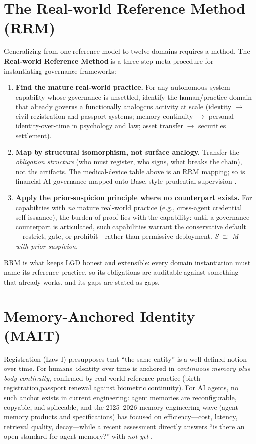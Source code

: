 \documentclass[12pt]{article}
\begin{document}
\section{The Real-world Reference Method (RRM)}\label{sec:rrm}

Generalizing from one reference model to twelve domains requires a method. The \textbf{Real-world Reference Method} is a three-step meta-procedure for instantiating governance frameworks:

\begin{enumerate}[itemsep=2pt]
  \item \textbf{Find the mature real-world practice.} For any autonomous-system capability whose governance is unsettled, identify the human/practice domain that already governs a functionally analogous activity at scale (identity $\rightarrow$ civil registration and passport systems; memory continuity $\rightarrow$ personal-identity-over-time in psychology and law; asset transfer $\rightarrow$ securities settlement).
  \item \textbf{Map by structural isomorphism, not surface analogy.} Transfer the \emph{obligation structure} (who must register, who signs, what breaks the chain), not the artifacts. The medical-device table above is an RRM mapping; so is financial-AI governance mapped onto Basel-style prudential supervision \cite{lgdfin}.
  \item \textbf{Apply the prior-suspicion principle where no counterpart exists.} For capabilities with \emph{no} mature real-world practice (e.g., cross-agent credential self-issuance), the burden of proof lies with the capability: until a governance counterpart is articulated, such capabilities warrant the conservative default---restrict, gate, or prohibit---rather than permissive deployment. \emph{S $\cong$ M with prior suspicion.}
\end{enumerate}

RRM is what keeps LGD honest and extensible: every domain instantiation must name its reference practice, so its obligations are auditable against something that already works, and its gaps are stated as gaps.

\section{Memory-Anchored Identity (MAIT)}\label{sec:mait}

Registration (Law I) presupposes that ``the same entity'' is a well-defined notion over time. For humans, identity over time is anchored in \emph{continuous memory plus body continuity}, confirmed by real-world reference practice (birth registration,passport renewal against biometric continuity). For AI agents, no such anchor exists in current engineering: agent memories are reconfigurable, copyable, and spliceable, and the 2025--2026 memory-engineering wave (agent-memory products and specifications) has focused on efficiency---cost, latency, retrieval quality, decay---while a recent assessment directly answers ``is there an open standard for agent memory?'' with \emph{not yet} \cite{memorystandard}.
\end{document}
